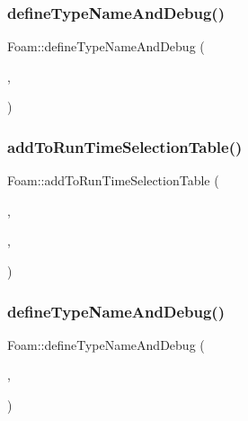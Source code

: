 \mbox{\label{namespaceFoam_a707e158d8efe7f6744d0d4c998ae9d3f}} 
\subsubsection{\texorpdfstring{define\+Type\+Name\+And\+Debug()}{defineTypeNameAndDebug()}\hspace{0.1cm}{\footnotesize\ttfamily [7/50]}}
{\footnotesize\ttfamily Foam\+::define\+Type\+Name\+And\+Debug (\begin{DoxyParamCaption}\item[{\hyperlink{classFoam_1_1SP3Neutronics}{S\+P3\+Neutronics}}]{,  }\item[{0}]{ }\end{DoxyParamCaption})}

\mbox{\label{namespaceFoam_a9ddaf5f5b600f2d89285320c786421c1}} 
\subsubsection{\texorpdfstring{add\+To\+Run\+Time\+Selection\+Table()}{addToRunTimeSelectionTable()}\hspace{0.1cm}{\footnotesize\ttfamily [5/6]}}
{\footnotesize\ttfamily Foam\+::add\+To\+Run\+Time\+Selection\+Table (\begin{DoxyParamCaption}\item[{\hyperlink{classFoam_1_1neutronics}{neutronics}}]{,  }\item[{\hyperlink{classFoam_1_1SP3Neutronics}{S\+P3\+Neutronics}}]{,  }\item[{dictionary}]{ }\end{DoxyParamCaption})}

\mbox{\label{namespaceFoam_a01946a4582cce18991f360bd99eb3c0e}} 
\subsubsection{\texorpdfstring{define\+Type\+Name\+And\+Debug()}{defineTypeNameAndDebug()}\hspace{0.1cm}{\footnotesize\ttfamily [8/50]}}
{\footnotesize\ttfamily Foam\+::define\+Type\+Name\+And\+Debug (\begin{DoxyParamCaption}\item[{\hyperlink{classFoam_1_1XS}{XS}}]{,  }\item[{0}]{ }\end{DoxyParamCaption})}

